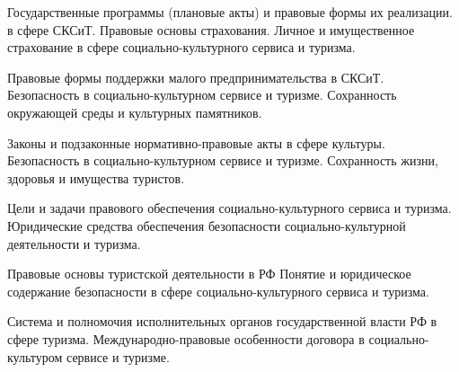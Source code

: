 \documentclass[
	14pt,
	a4paper,
	]
	{scrartcl}
\begin{document}
\vfill

\newpage


\shapk
{}
\setcounter{zad}{0}

\vfill
\z Государственные программы  (плановые акты) и правовые формы их реализации. в сфере СКСиТ.
 \vfill
\z Правовые основы страхования. Личное и имущественное страхование в сфере социально-культурного сервиса и туризма.
 \vfill

\vfill

\newpage


\shapk
{}
\setcounter{zad}{0}

\vfill
\z Правовые формы поддержки малого предпринимательства в СКСиТ.
 \vfill
\z Безопасность в социально-культурном сервисе и туризме. Сохранность окружающей среды и культурных памятников.
 \vfill

\vfill

\newpage


\shapk
{}
\setcounter{zad}{0}

\vfill
\z Законы и подзаконные нормативно-правовые акты в сфере культуры.
 \vfill
\z Безопасность в социально-культурном сервисе и туризме. Сохранность жизни, здоровья и имущества туристов.
 \vfill

\vfill

\newpage


\shapk
{}
\setcounter{zad}{0}

\vfill
\z Цели и задачи правового обеспечения социально-культурного сервиса и туризма.
 \vfill
\z Юридические средства обеспечения безопасности социально-культурной деятельности и туризма.
 \vfill

\vfill

\newpage


\shapk
{}
\setcounter{zad}{0}

\vfill
\z Правовые основы туристской деятельности в РФ
 \vfill
\z Понятие и юридическое содержание безопасности в сфере социально-культурного сервиса и туризма.
 \vfill

\vfill

\newpage


\shapk
{}
\setcounter{zad}{0}

\vfill
\z Система и полномочия исполнительных органов государственной власти РФ в сфере туризма.
 \vfill
\z Международно-правовые особенности договора в социально-культуром сервисе и туризме.
 \vfill
\end{document}
